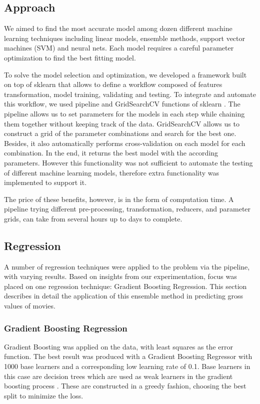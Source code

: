 \subsection{Approach}
We aimed to find the most accurate model among dozen different machine learning techniques including linear models, ensemble methods, support vector machines (SVM) and neural nets.  Each model requires a careful parameter optimization to find the best fitting model. 
 
To solve the model selection and optimization, we developed a framework built on top of sklearn that allows to define a workflow composed of features transformation, model training, validating and testing. To integrate and automate this workflow, we used  pipeline and GridSearchCV functions of sklearn \cite{sklearnpipeline}. The pipeline allows us to set parameters for the models in each step while chaining them together without keeping track of the data. GridSearchCV allows us to construct a grid of the parameter combinations and search for the best one. Besides, it also automatically performs cross-validation on each model for each combination. In the end, it returns the best model with the according parameters. However this functionality was not sufficient to automate the testing of different machine learning models, therefore extra functionality was implemented to support it.

The price of these benefits, however, is in the form of computation time. A pipeline trying different pre-processing, transformation, reducers, and parameter grids,  can take from several hours up to days to complete. 
\subsection{Regression}

A number of regression techniques were applied to the problem via the pipeline, with varying results. Based on insights from our experimentation, focus was placed on one regression technique: Gradient Boosting Regression. This section describes in detail the application of this ensemble method in predicting gross values of movies. 

\subsubsection{Gradient Boosting Regression}
Gradient Boosting was applied on the data, with least squares as the error function. The best result was produced with a Gradient Boosting Regressor with 1000 base learners and a corresponding low learning rate of 0.1. Base learners in this case are decision trees which are used as weak learners in the gradient boosting process \cite{natekin2013gradient}. These are constructed in a greedy fashion, choosing the best split to minimize the loss. 

